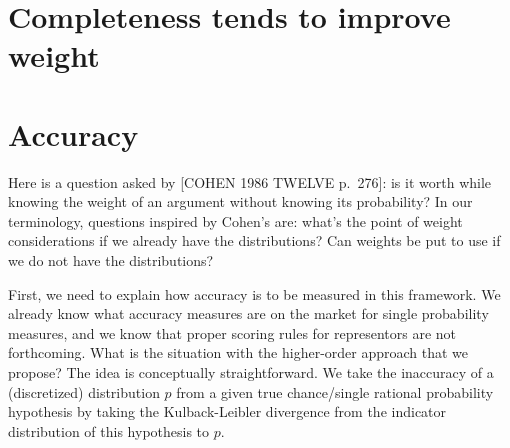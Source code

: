 \documentclass[
  10pt,
  dvipsnames,enabledeprecatedfontcommands]{scrartcl}
\begin{document}

\hypertarget{completeness-tends-to-improve-weight}{%
\section{Completeness tends to improve
weight}\label{completeness-tends-to-improve-weight}}

\hypertarget{accuracy}{%
\section{Accuracy}\label{accuracy}}

Here is a question asked by {[}COHEN 1986 TWELVE p.~276{]}: is it worth
while knowing the weight of an argument without knowing its probability?
In our terminology, questions inspired by Cohen's are: what's the point
of weight considerations if we already have the distributions? Can
weights be put to use if we do not have the distributions?

First, we need to explain how accuracy is to be measured in this
framework. We already know what accuracy measures are on the market for
single probability measures, and we know that proper scoring rules for
representors are not forthcoming. What is the situation with the
higher-order approach that we propose? The idea is conceptually
straightforward. We take the inaccuracy of a (discretized) distribution
\(p\) from a given true chance/single rational probability hypothesis by
taking the Kulback-Leibler divergence from the indicator distribution of
this hypothesis to \(p\).
\end{document}
